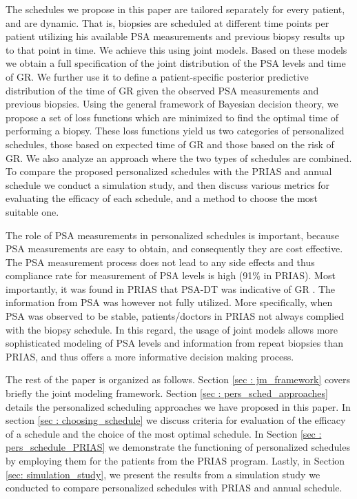 The schedules we propose in this paper are tailored separately for every patient, and are dynamic. That is, biopsies are scheduled at different time points per patient utilizing his available PSA measurements and previous biopsy results up to that point in time. We achieve this using joint models. Based on these models we obtain a full specification of the joint distribution of the PSA levels and time of GR. We further use it to define a patient-specific posterior predictive distribution of the time of GR given the observed PSA measurements and previous biopsies. Using the general framework of Bayesian decision theory, we propose a set of loss functions which are minimized to find the optimal time of performing a biopsy. These loss functions yield us two categories of personalized schedules, those based on expected time of GR and those based on the risk of GR. We also analyze an approach where the two types of schedules are combined. To compare the proposed personalized schedules with the PRIAS and annual schedule we conduct a simulation study, and then discuss various metrics for evaluating the efficacy of each schedule, and a method to choose the most suitable one.

The role of PSA measurements in personalized schedules is important, because PSA measurements are easy to obtain, and consequently they are cost effective. The PSA measurement process does not lead to any side effects and thus compliance rate for measurement of PSA levels is high (91\% in PRIAS). Most importantly, it was found in PRIAS that PSA-DT was indicative of GR \citep{bokhorst2015compliance}. The information from PSA was however not fully utilized. More specifically, when PSA was observed to be stable, patients/doctors in PRIAS not always complied with the biopsy schedule. In this regard, the usage of joint models allows more sophisticated modeling of PSA levels and information from repeat biopsies than PRIAS, and thus offers a more informative decision making process.

The rest of the paper is organized as follows. Section \ref{sec : jm_framework} covers briefly the joint modeling framework. Section \ref{sec : pers_sched_approaches} details the personalized scheduling approaches we have proposed in this paper. In section \ref{sec : choosing_schedule} we discuss criteria for evaluation of the efficacy of a schedule and the choice of the most optimal schedule. In Section \ref{sec : pers_schedule_PRIAS} we demonstrate the functioning of personalized schedules by employing them for the patients from the PRIAS program. Lastly, in Section \ref{sec: simulation_study}, we present the results from a simulation study we conducted to compare personalized schedules with PRIAS and annual schedule.